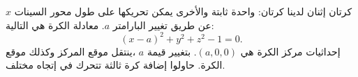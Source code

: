 \begin{surferPage}{كرتان إثنان}
لدينا كرتان: واحدة ثابتة والأخرى يمكن تحريكها على طول محور السينات $x$ عن طريق تغيير البارامتر $a$.
معادلة الكرة هي التالية:
\[(x-a)^2+y^2+z^2-1=0.\]
إحداثيات مركز الكرة هي $(a,0,0)$. بتغيير قيمة $a$ ،ينتقل موقع المركز وكذلك موقع الكرة. حاولوا إضافة كرة ثالثة تتحرك في إتجاه مختلف. 
\end{surferPage}